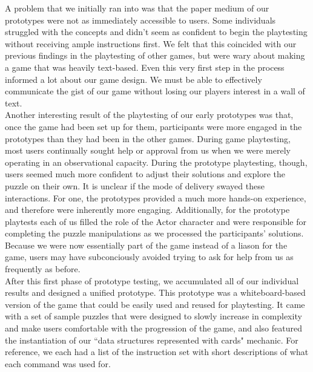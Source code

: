 A problem that we initially ran into was that the paper medium of our prototypes were not as immediately accessible to users. Some individuals struggled with the concepts and didn't seem as confident to begin the playtesting without receiving ample instructions first. We felt that this coincided with our previous findings in the playtesting of other games, but were wary about making a game that was heavily text-based. Even this very first step in the process informed a lot about our game design. We must be able to effectively communicate the gist of our game without losing our players interest in a wall of text.\\

Another interesting result of the playtesting of our early prototypes was that, once the game had been set up for them, participants were more engaged in the prototypes than they had been in the other games. During game playtesting, most users continually sought help or approval from us when we were merely operating in an observational capacity. During the prototype playtesting, though, users seemed much more confident to adjust their solutions and explore the puzzle on their own. It is unclear if the mode of delivery swayed these interactions. For one, the prototypes provided a much more hands-on experience, and therefore were inherently more engaging. Additionally, for the prototype playtests each of us filled the role of the Actor character and were responsible for completing the puzzle manipulations as we processed the participants' solutions. Because we were now essentially part of the game instead of a liason for the game, users may have subconciously avoided trying to ask for help from us as frequently as before.\\

After this first phase of prototype testing, we accumulated all of our individual results and designed a unified prototype. This prototype was a whiteboard-based version of the game that could be easily used and reused for playtesting. It came with a set of sample puzzles that were designed to slowly increase in complexity and make users comfortable with the progression of the game, and also featured the instantiation of our ``data structures represented with cards" mechanic. For reference, we each had a list of the instruction set with short descriptions of what each command was used for.\\

